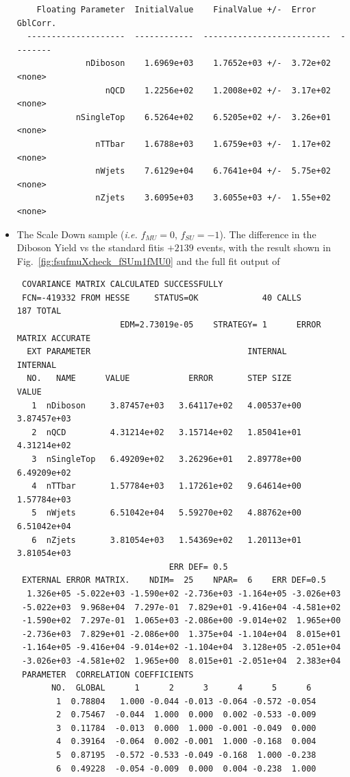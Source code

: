 \begin{itemize}
{\begin{verbatim}
    Floating Parameter  InitialValue    FinalValue +/-  Error     GblCorr.
  --------------------  ------------  --------------------------  --------
              nDiboson    1.6969e+03    1.7652e+03 +/-  3.72e+02  <none>
                  nQCD    1.2256e+02    1.2008e+02 +/-  3.17e+02  <none>
            nSingleTop    6.5264e+02    6.5205e+02 +/-  3.26e+01  <none>
                nTTbar    1.6788e+03    1.6759e+03 +/-  1.17e+02  <none>
                nWjets    7.6129e+04    6.7641e+04 +/-  5.75e+02  <none>
                nZjets    3.6095e+03    3.6055e+03 +/-  1.55e+02  <none>

\end{verbatim}
}

\item The Scale Down sample (\textit{i.e.} $f_{MU}=0$, $f_{SU}=-1$). The difference in the Diboson Yield vs the standard fitis $+2139$ events, with the result shown in Fig.~\ref{fig:fsufmuXcheck_fSUm1fMU0} and the full fit output of
{\tiny
\begin{verbatim}
 COVARIANCE MATRIX CALCULATED SUCCESSFULLY
 FCN=-419332 FROM HESSE     STATUS=OK             40 CALLS         187 TOTAL
                     EDM=2.73019e-05    STRATEGY= 1      ERROR MATRIX ACCURATE 
  EXT PARAMETER                                INTERNAL      INTERNAL  
  NO.   NAME      VALUE            ERROR       STEP SIZE       VALUE   
   1  nDiboson     3.87457e+03   3.64117e+02   4.00537e+00   3.87457e+03
   2  nQCD         4.31214e+02   3.15714e+02   1.85041e+01   4.31214e+02
   3  nSingleTop   6.49209e+02   3.26296e+01   2.89778e+00   6.49209e+02
   4  nTTbar       1.57784e+03   1.17261e+02   9.64614e+00   1.57784e+03
   5  nWjets       6.51042e+04   5.59270e+02   4.88762e+00   6.51042e+04
   6  nZjets       3.81054e+03   1.54369e+02   1.20113e+01   3.81054e+03
                               ERR DEF= 0.5
 EXTERNAL ERROR MATRIX.    NDIM=  25    NPAR=  6    ERR DEF=0.5
  1.326e+05 -5.022e+03 -1.590e+02 -2.736e+03 -1.164e+05 -3.026e+03 
 -5.022e+03  9.968e+04  7.297e-01  7.829e+01 -9.416e+04 -4.581e+02 
 -1.590e+02  7.297e-01  1.065e+03 -2.086e+00 -9.014e+02  1.965e+00 
 -2.736e+03  7.829e+01 -2.086e+00  1.375e+04 -1.104e+04  8.015e+01 
 -1.164e+05 -9.416e+04 -9.014e+02 -1.104e+04  3.128e+05 -2.051e+04 
 -3.026e+03 -4.581e+02  1.965e+00  8.015e+01 -2.051e+04  2.383e+04 
 PARAMETER  CORRELATION COEFFICIENTS  
       NO.  GLOBAL      1      2      3      4      5      6
        1  0.78804   1.000 -0.044 -0.013 -0.064 -0.572 -0.054
        2  0.75467  -0.044  1.000  0.000  0.002 -0.533 -0.009
        3  0.11784  -0.013  0.000  1.000 -0.001 -0.049  0.000
        4  0.39164  -0.064  0.002 -0.001  1.000 -0.168  0.004
        5  0.87195  -0.572 -0.533 -0.049 -0.168  1.000 -0.238
        6  0.49228  -0.054 -0.009  0.000  0.004 -0.238  1.000


\end{verbatim}}
\end{itemize}
